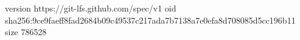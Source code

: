 version https://git-lfs.github.com/spec/v1
oid sha256:9ce9faeff8fad2684b09c49537c217ada7b7138a7e0efa8d708085d5cc196b11
size 786528
